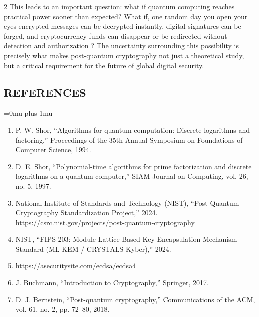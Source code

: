 \begin{multicols}{2}
  \noindent
  This leads to an important question: what if quantum computing reaches practical power sooner than
  expected? What if, one random day you open your eyes encrypted messages can be decrypted
  instantly, digital signatures can be forged, and cryptocurrency funds can disappear or be redirected
  without detection and authorization ? The uncertainty surrounding this possibility is precisely what
  makes post-quantum cryptography not just a theoretical study, but a critical requirement for the future
  of global digital security.

  \subsection*{\centering\uppercase{References}}
  \begin{justify}
  \Urlmuskip=0mu plus 1mu\relax
  \begin{enumerate}
    \item P. W. Shor, “Algorithms for quantum computation: Discrete logarithms and
      factoring,” Proceedings of the 35th Annual Symposium on Foundations of Computer
      Science, 1994.
    \item D. E. Shor, “Polynomial-time algorithms for prime factorization and discrete
      logarithms on a quantum computer,” SIAM Journal on Computing, vol. 26, no. 5,
      1997.
    \item National Institute of Standards and Technology (NIST), “Post-Quantum
      Cryptography Standardization Project,” 2024. \url{https://csrc.nist.gov/projects/post-quantum-cryptography}
      \item NIST, “FIPS 203: Module-Lattice-Based Key-Encapsulation Mechanism Standard
      (ML-KEM / CRYSTALS-Kyber),” 2024.
      \item \url{https://asecuritysite.com/ecdsa/ecdsa4}
      \item J. Buchmann, “Introduction to Cryptography,” Springer, 2017.
      \item D. J. Bernstein, “Post-quantum cryptography,” Communications of the ACM, vol. 61,
      no. 2, pp. 72--80, 2018.
  \end{enumerate}
  \end{justify}
\end{multicols}